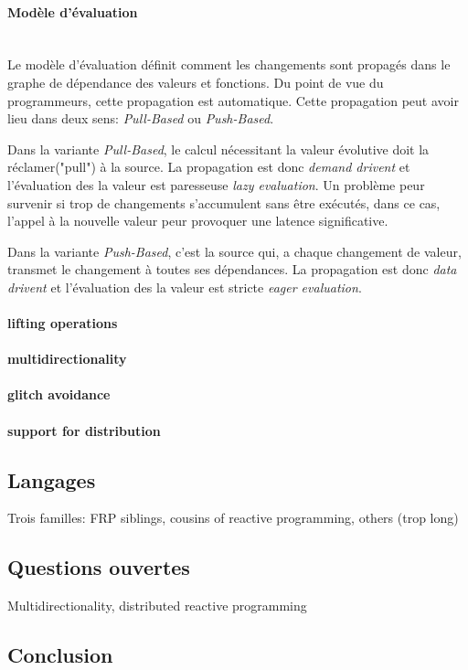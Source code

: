 \documentclass[11pt,twocolumn]{article}
\begin{document}
\paragraph{Modèle d'évaluation}~~\\
Le modèle d'évaluation définit comment les changements sont propagés dans le graphe de dépendance des valeurs et fonctions. Du point de vue du programmeurs, cette propagation est automatique. Cette propagation peut avoir lieu dans deux sens: \textit{Pull-Based} ou \textit{Push-Based}.

Dans la variante \textit{Pull-Based}, le calcul nécessitant la valeur évolutive doit la réclamer("pull") à la source. La propagation est donc \textit{demand drivent} et l'évaluation des la valeur est paresseuse \textit{lazy evaluation}. Un problème peur survenir si trop de changements s'accumulent sans être exécutés, dans ce cas, l'appel à la nouvelle valeur peur provoquer une latence significative.

Dans la variante \textit{Push-Based}, c'est la source qui, a chaque changement de valeur, transmet le changement à toutes ses dépendances. La propagation est donc \textit{data drivent} et l'évaluation des la valeur est stricte \textit{eager evaluation}.

\paragraph{lifting operations}

\paragraph{multidirectionality}

\paragraph{glitch avoidance}

\paragraph{support for distribution}

\subsection*{Langages}
Trois familles: FRP siblings, cousins of reactive programming, others (trop long)

\subsection*{Questions ouvertes}
Multidirectionality, distributed reactive programming 

\subsection*{Conclusion}
\end{document}
